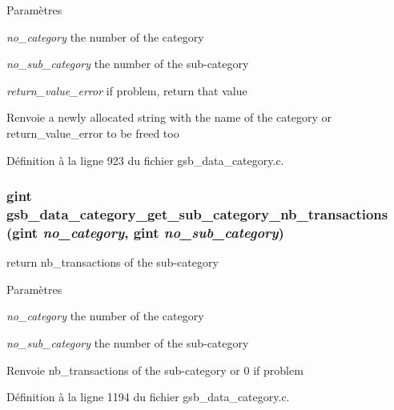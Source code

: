 \begin{DoxyParams}{Paramètres}
\item[{\em no\_\-category}]the number of the category \item[{\em no\_\-sub\_\-category}]the number of the sub-\/category \item[{\em return\_\-value\_\-error}]if problem, return that value\end{DoxyParams}
\begin{DoxyReturn}{Renvoie}
a newly allocated string with the name of the category or return\_\-value\_\-error to be freed too 
\end{DoxyReturn}


Définition à la ligne 923 du fichier gsb\_\-data\_\-category.c.

\subsubsection[{gsb\_\-data\_\-category\_\-get\_\-sub\_\-category\_\-nb\_\-transactions}]{\setlength{\rightskip}{0pt plus 5cm}gint gsb\_\-data\_\-category\_\-get\_\-sub\_\-category\_\-nb\_\-transactions (gint {\em no\_\-category}, \/  gint {\em no\_\-sub\_\-category})}\label{gsb__data__category_8c_a5f16d58b41f4b4278206b7a1e060989f}
return nb\_\-transactions of the sub-\/category


\begin{DoxyParams}{Paramètres}
\item[{\em no\_\-category}]the number of the category \item[{\em no\_\-sub\_\-category}]the number of the sub-\/category\end{DoxyParams}
\begin{DoxyReturn}{Renvoie}
nb\_\-transactions of the sub-\/category or 0 if problem 
\end{DoxyReturn}


Définition à la ligne 1194 du fichier gsb\_\-data\_\-category.c.

